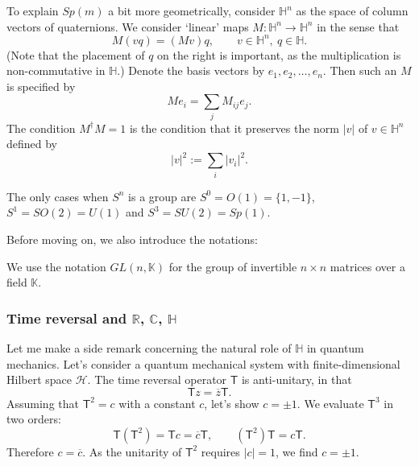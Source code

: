 \documentclass[12pt]{article}
\numberwithin{equation}{section}
\def\bC{\mathbb{C}}
\def\bH{\mathbb{H}}
\def\bK{\mathbb{K}}
\def\bR{\mathbb{R}}
\def\cH{\mathcal{H}}
\def\sT{\mathsf{T}}
\begin{document}
To explain $Sp(m)$ a bit more geometrically, consider $\bH^n$
as the space of column vectors of quaternions. 
We consider `linear' maps  $M:\bH^n\to \bH^n$ in the sense that
\begin{equation}
M (vq) = (Mv) q, \qquad v\in \bH^n,\ q\in \bH.
\end{equation} 
(Note that the placement of $q$ on the right is important, 
as the multiplication is non-commutative in $\bH$.)
Denote the basis vectors by $e_1,e_2,\ldots,e_n$.
Then such an $M$ is specified by \begin{equation}
M e_i = \sum_j M_{ij} e_j.
\end{equation}
The condition $M^\dagger M=1$ is the condition that it preserves the norm $|v|$ of $v\in \bH^n$
defined by \begin{equation}
  |v|^2 := \sum_i |v_i|^2.
\end{equation}

\begin{fact}
  The only cases when $S^n$ is a group are $S^0=O(1)=\{1,-1\}$, $S^1=SO(2)=U(1)$
  and $S^3=SU(2)=Sp(1)$.
\end{fact}

Before moving on,
we also introduce the notations:
\begin{definition}
We use the notation $GL(n,\bK)$ for the group of invertible $n\times n$ matrices over a field $\bK$.
\end{definition}

\subsubsection{Time reversal and $\bR$, $\bC$, $\bH$}

Let me make a side remark concerning the natural role of $\bH$ in quantum mechanics.
Let's consider a quantum mechanical system with finite-dimensional Hilbert space $\cH$.
The time reversal operator $\sT$ is anti-unitary, in that 
\begin{equation}
  \sT z = \overline z \sT.
\end{equation}
Assuming that $\sT^2=c$ with a constant $c$, let's show $c=\pm1$. We evaluate $\sT^3$ in two orders:
\begin{equation}
\sT(\sT^2)= \sT c = \overline{c}\sT,\qquad
(\sT^2)\sT = c\sT.
\end{equation} Therefore $c=\overline{c}$. As the unitarity of $\sT^2$ requires $|c|=1$,
 we find $c=\pm 1$.
\end{document}

